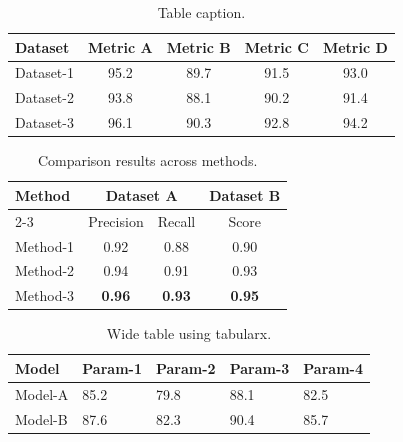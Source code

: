 
\begin{table}[t]
    \centering
    \caption{Table caption.}
    \label{tab:example}
    \begin{tabular}{lcccc}
        \toprule
        Dataset & Metric A & Metric B & Metric C & Metric D \\
        \midrule
        Dataset-1 & 95.2 & 89.7 & 91.5 & 93.0 \\
        Dataset-2 & 93.8 & 88.1 & 90.2 & 91.4 \\
        Dataset-3 & 96.1 & 90.3 & 92.8 & 94.2 \\
        \bottomrule
    \end{tabular}
\end{table}

\begin{table}[t]
    \centering
    \caption{Comparison results across methods.}
    \label{tab:comparison}
    \begin{tabular}{lccc}
        \toprule
        \multirow{2}{*}{Method} & \multicolumn{2}{c}{Dataset A} & \multirow{2}{*}{Dataset B} \\
        \cmidrule{2-3}
        & Precision & Recall & Score \\
        \midrule
        Method-1 & 0.92 & 0.88 & 0.90 \\
        Method-2 & 0.94 & 0.91 & 0.93 \\
        Method-3 & \textbf{0.96} & \textbf{0.93} & \textbf{0.95} \\
        \bottomrule
    \end{tabular}
\end{table}

\begin{table}[t]
    \centering
    \caption{Wide table using tabularx.}
    \label{tab:wide}
    \begin{tabularx}{\columnwidth}{lXXXX}
        \toprule
        Model & Param-1 & Param-2 & Param-3 & Param-4 \\
        \midrule
        Model-A & 85.2 & 79.8 & 88.1 & 82.5 \\
        Model-B & 87.6 & 82.3 & 90.4 & 85.7 \\
        \bottomrule
    \end{tabularx}
\end{table}
